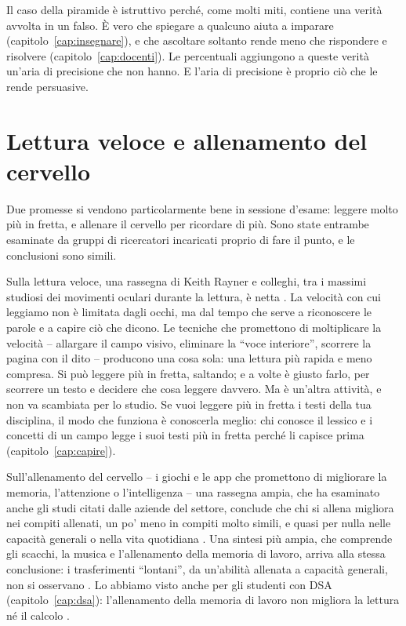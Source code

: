 Il caso della piramide è istruttivo perché, come molti miti, contiene
una verità avvolta in un falso. È vero che spiegare a qualcuno aiuta a
imparare (capitolo~\ref{cap:insegnare}), e che ascoltare soltanto
rende meno che rispondere e risolvere (capitolo~\ref{cap:docenti}).
Le percentuali aggiungono a queste verità un'aria di precisione che non
hanno. E l'aria di precisione è proprio ciò che le rende persuasive.

\section{Lettura veloce e allenamento del cervello}

Due promesse si vendono particolarmente bene in sessione d'esame:
leggere molto più in fretta, e allenare il cervello per ricordare di
più. Sono state entrambe esaminate da gruppi di ricercatori incaricati
proprio di fare il punto, e le conclusioni sono simili.

Sulla lettura veloce, una rassegna di Keith Rayner e colleghi, tra i
massimi studiosi dei movimenti oculari durante la lettura, è netta
\parencite{rayner2016}. La velocità con cui leggiamo non è limitata
dagli occhi, ma dal tempo che serve a riconoscere le parole e a
capire ciò che dicono. Le tecniche che promettono di moltiplicare la
velocità -- allargare il campo visivo, eliminare la \enquote{voce
interiore}, scorrere la pagina con il dito -- producono una cosa
sola: una lettura più rapida e meno compresa. Si può leggere più in
fretta, saltando; e a volte è giusto farlo, per scorrere un testo e
decidere che cosa leggere davvero. Ma è un'altra attività, e non va
scambiata per lo studio. Se vuoi leggere più in fretta i testi della
tua disciplina, il modo che funziona è conoscerla meglio: chi conosce
il lessico e i concetti di un campo legge i suoi testi più in fretta
perché li capisce prima (capitolo~\ref{cap:capire}).

Sull'allenamento del cervello -- i giochi e le app che promettono di
migliorare la memoria, l'attenzione o l'intelligenza -- una rassegna
ampia, che ha esaminato anche gli studi citati dalle aziende del
settore, conclude che chi si allena migliora nei compiti allenati, un po' meno
in compiti molto simili, e quasi per nulla nelle capacità generali o
nella vita quotidiana \parencite{simons2016}. Una sintesi più ampia,
che comprende gli scacchi, la musica e l'allenamento della memoria di
lavoro, arriva alla stessa conclusione: i trasferimenti \enquote{lontani},
da un'abilità allenata a capacità generali, non si osservano
\parencite{sala2017}. Lo abbiamo visto anche per gli studenti con
DSA (capitolo~\ref{cap:dsa}): l'allenamento della memoria di lavoro
non migliora la lettura né il calcolo \parencite{melbylervag2016}.

